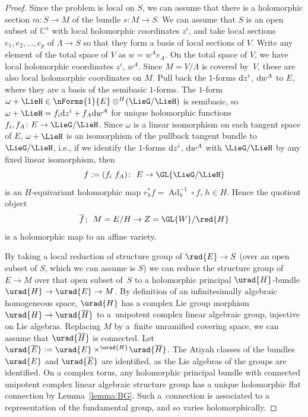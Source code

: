 \documentclass[pdftex]{sigma}
\numberwithin{equation}{section}
\renewcommand{\C}{\mathbb{C}}
\DeclareMathOperator{\Ad}{Ad}
\newcommand{\amal}[3]{\ensuremath{{#1} \mathbin{\times^{#2}} \! #3}}
\begin{document}
\begin{proof}
Since the problem is local on $S$, we can assume that there is a holomorphic section $m \colon S \to M$ of the
bundle $s \colon M \to S$.
We can assume that $S$ is an open subset of $\C^{n}$ with local holomorphic coordinates $z^i$, and take local sections $e_1, e_2,
 \dots, e_p$ of $\Lambda \to S$ so that they form a basis of local sections of $V$.
Write any element of the total space of $V$ as $w = w^Ae_A$.
On the total space of $V$, we have local holomorphic coordinates $z^i$, $w^A$.
Since $M=V/\Lambda$ is covered by~$V$, these are also local holomorphic coordinates on $M$.
Pull back the $1$-forms ${\rm d}z^i$, ${\rm d}w^A$ to $E$, where they are a basis of the semibasic $1$-forms.
The $1$-form $\omega+\LieH \in \nForms{1}{E} \otimes^H\!(\LieG/\LieH)$ is semibasic, so $\omega+\LieH = f_i {\rm d}z^i + f_A {\rm d}w^A$
for unique holomorphic functions $f_i, f_A \colon E \to \LieG/\LieH$.
Since $\omega$ is a linear isomorphism on each tangent space of $E$, $\omega+\LieH$ is an isomorphism of the pullback tangent bundle to $\LieG/\LieH$, i.e., if we identify the $1$-forms ${\rm d}z^i$, ${\rm d}w^A$ with $\LieG/\LieH$ by any fixed linear isomorphism, then
\[
f := (f_i \ f_A) \colon\ E \to \GL{\LieG/\LieH}
\]
is an $H$-equivariant holomorphic map $r_h^*f = \Ad_h^{-1} \circ f$, $h \in H$.
Hence the quotient object
\[
\overline{f} \colon\ M = E/H \to Z = \GL{W}/\red{H}
\]
is a holomorphic map to an affine variety.

By taking a local reduction of structure group of $\red{E} \to S$ (over an open subset of $S$, which we can assume is $S$) we can reduce the structure group of $E \to M$ over that open subset of~$S$ to a holomorphic principal $\urad{H}$-bundle $\urad{H} \to \urad{E} \to M$.
By definition of an infinitesimally algebraic homogeneous space, $\urad{H}$ has a complex Lie group morphism $\urad{H} \to \urad{\overline{H}}$ to a~unipotent complex linear algebraic group, injective on Lie algebras.
Replacing $M$ by a~finite unramified covering space, we can assume that $\urad{\overline{H}}$ is connected.
Let ${\urad{\overline{E}} := \amal{\urad{E}}{\urad{H}}{\urad{\overline{H}}}}$.
The Atiyah classes of the bundles $\urad{E}$ and $\urad{\overline{E}}$ are identified, as the Lie algebras of the groups are identified.
On a complex torus, any holomorphic principal bundle with connected unipotent complex linear algebraic structure group has a unique holomorphic flat connection by Lemma~\ref{lemma:BG}.
Such a~connection is associated to a representation of the fundamental group, and so varies holomorphically.
\end{proof}
\end{document}
